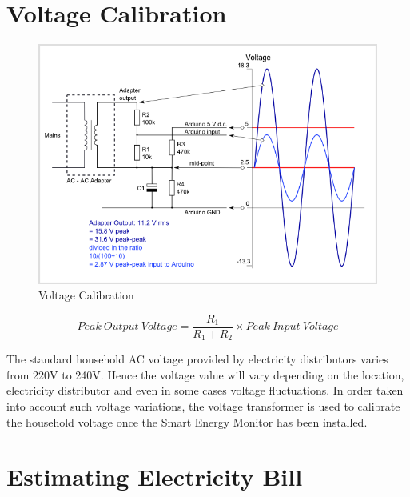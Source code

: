 \section{Voltage Calibration}
{


\begin{figure}[H]
	    \includegraphics[scale=0.70]{images/volt.png}
	    \centering
	    \caption{Voltage Calibration}
	    \label{volt}
	\end{figure}

\begin{equation}
    Peak\ Output\ Voltage = \frac{R_1} {R_1 + R_2} \times Peak\ Input\ Voltage
\end{equation}

The standard household AC voltage provided by electricity distributors varies from 220V to 240V. 
Hence the voltage value will vary depending on the location, electricity distributor and even in some cases voltage fluctuations.
In order taken into account such voltage variations, the voltage transformer is used to calibrate the household voltage once the Smart Energy Monitor has been installed.  
}

\section{Estimating Electricity Bill}

